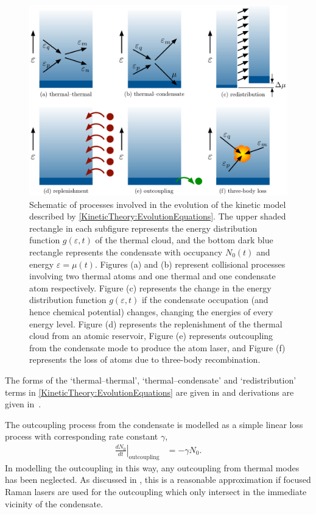 \begin{figure}
    \centering
    \includegraphics[width=14cm]{ProcessDiagrams}
    \caption{Schematic of processes involved in the evolution of the kinetic model described by \eqref{KineticTheory:EvolutionEquations}.  The upper shaded rectangle in each subfigure represents the energy distribution function $g(\varepsilon, t)$ of the thermal cloud, and the bottom dark blue rectangle represents the condensate with occupancy $N_0(t)$ and energy $\varepsilon = \mu(t)$. Figures (a) and (b) represent collisional processes involving two thermal atoms and one thermal and one condensate atom respectively. Figure (c) represents the change in the energy distribution function $g(\varepsilon, t)$ if the condensate occupation (and hence chemical potential) changes, changing the energies of every energy level. Figure (d) represents the replenishment of the thermal cloud from an atomic reservoir, Figure (e) represents outcoupling from the condensate mode to produce the atom laser, and Figure (f) represents the loss of atoms due to three-body recombination.}
    \label{KineticTheory:ProcessDiagrams}
\end{figure}

The forms of the `thermal--thermal', `thermal--condensate' and `redistribution' terms in \eqref{KineticTheory:EvolutionEquations} are given in  and derivations are given in~\citep{Bijlsma:2000}.

The outcoupling process from the condensate is modelled as a simple linear loss process with corresponding rate constant $\gamma$,
\begin{align}
    \left.\frac{d N_0}{d t}\right|_\text{outcoupling} &= - \gamma N_0.
    \label{KineticTheory:OutcouplingProcess}
\end{align}
In modelling the outcoupling in this way, any outcoupling from thermal modes has been neglected. As discussed in , this is a reasonable approximation if focused Raman lasers are used for the outcoupling which only intersect in the immediate vicinity of the condensate. 


